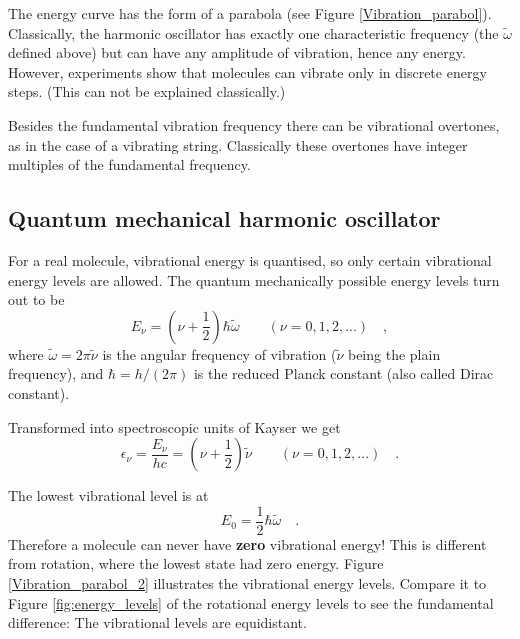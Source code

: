 The energy curve has the form of a parabola (see Figure
\ref{Vibration_parabol}). Classically, the harmonic oscillator has
exactly one characteristic frequency (the $\tilde{\omega}$ defined
above) but can have any amplitude of vibration, hence any energy.
However, experiments show that molecules can vibrate only in discrete
energy steps. (This can not be explained classically.)

Besides the fundamental vibration frequency there can be vibrational
overtones, as in the case of a vibrating string. Classically these overtones have
integer multiples of the fundamental frequency.



\subsection{Quantum mechanical harmonic oscillator} 
For a real molecule, vibrational energy is quantised, so only certain
vibrational energy levels are allowed. The quantum mechanically possible energy levels turn out to be 
\begin{equation}
E_\nu = (\nu+\frac{1}{2})\hbar\tilde{\omega} \qquad (\nu = 0, 1, 2, ...) \quad ,
\end{equation}
where $\tilde{\omega} = 2 \pi \tilde{\nu}$ is the angular frequency of
vibration ($\tilde{\nu}$ being the plain frequency), and $\hbar =
h/(2\pi)$ is the reduced Planck constant (also called Dirac constant).

Transformed into spectroscopic units of Kayser we get
\begin{equation}
\epsilon_\nu = \frac{E_\nu}{hc} = (\nu + \frac{1}{2})\tilde{\nu} \qquad (\nu = 0, 1, 2, ...) \quad .
\end{equation}

The lowest vibrational level is at
\begin{equation}
E_0 = \frac{1}{2} \hbar \tilde{\omega} \quad .
\end{equation}
Therefore a molecule can never have \textbf{zero} vibrational energy!
This is different from rotation, where the lowest state had zero
energy. Figure \ref{Vibration_parabol_2} illustrates the vibrational
energy levels. Compare it to Figure \ref{fig:energy_levels} of the
rotational energy levels to see the fundamental difference: The
vibrational levels are equidistant.

